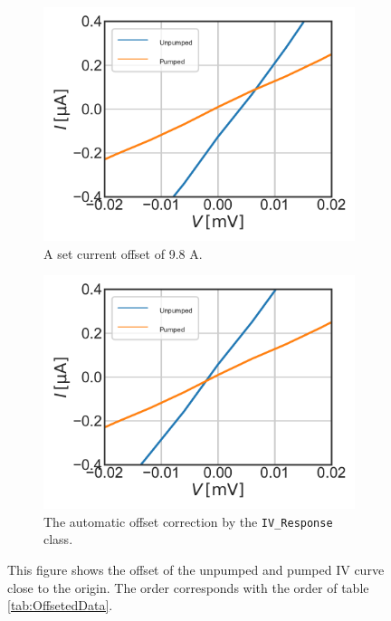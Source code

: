 \documentclass[]{article}
\begin{document}
\begin{figure}
	\begin{subfigure}[t]{0.49\textwidth}
		\centering
		\includegraphics[width=\linewidth]{./../Mixer_Unit_Test/2020_01_16_IVOffsetGausMask_9.8uA/Unpumped_Pumped_Offset_Zoom.pdf}
		\caption{A set current offset of 9.8 \textmu A.}
	\end{subfigure}
	\begin{subfigure}[t]{0.49\textwidth}
		\centering
		\includegraphics[width=\linewidth]{./../Mixer_Unit_Test/2020_01_14_Fixed_Mask_iLOfix/Unpumped_Pumped_Offset_Zoom.pdf}
		\caption{The automatic offset correction by the \texttt{IV\_Response} class. }
	\end{subfigure}
	\caption[]{This figure shows the offset of the unpumped and pumped IV curve close to the origin. The order corresponds with the order of table \ref{tab:OffsetedData}.
	}
	\label{fig:OffsetIVcurve}
\end{figure}
\end{document}
